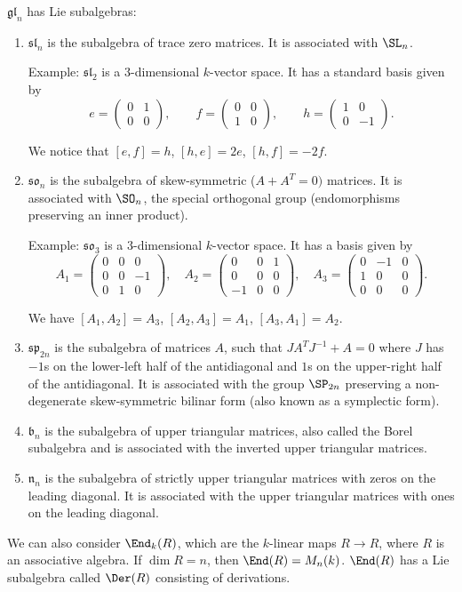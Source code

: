 $\mathfrak{gl}_n$ has Lie subalgebras:
\begin{enumerate}[label=(\arabic*)]
	\item $\mathfrak{sl}_n$ is the subalgebra of trace zero matrices. It is
		associated with $\SL_n$.

		Example: $\mathfrak{sl}_2$ is a $3$-dimensional $k$-vector space. It
		has a standard basis given by
		\[ e = \begin{pmatrix}0 & 1\\0 & 0\end{pmatrix},\qquad
			f = \begin{pmatrix}0 & 0\\1&0\end{pmatrix},\qquad
			h = \begin{pmatrix}1&0\\0&-1\end{pmatrix}. \]

		We notice that  $[e, f] = h$, $[h, e] = 2e$, $[h, f] = -2f$.

	\item $\mathfrak{so}_n$ is the subalgebra of skew-symmetric ($A + A^T = 0)$
		matrices. It is associated with $\SO_n$, the special orthogonal group
		(endomorphisms preserving an inner product).

		Example: $\mathfrak{so}_3$ is a $3$-dimensional $k$-vector space. It
		has a basis given by
		\[ A_1 = \begin{pmatrix}0&0&0\\0&0&-1\\0&1&0\end{pmatrix},\quad
			A_2 = \begin{pmatrix}0&0&1\\0&0&0\\-1&0&0\end{pmatrix},\quad
				A_3 = \begin{pmatrix}0&-1&0\\1&0&0\\0&0&0\end{pmatrix}.\]

		We have $[A_1, A_2] = A_3$,  $[A_2, A_3] = A_1$, $[A_3, A_1] = A_2$.

	\item $\mathfrak{sp}_{2n}$ is the subalgebra of matrices $A$, such that
		$JA^TJ^{-1} + A = 0$ where $J$ has $-1$s on the lower-left half of the
		antidiagonal and $1$s on the upper-right half of the antidiagonal. It
		is associated with the group $\SP_{2n}$ preserving a non-degenerate
		skew-symmetric bilinar form (also known as a symplectic form).

	\item $\mathfrak{b}_n$ is the subalgebra of upper triangular matrices, also
		called the Borel subalgebra and is associated with the inverted upper
		triangular matrices.

	\item $\mathfrak{n}_n$ is the subalgebra of strictly upper triangular matrices
		with zeros on the leading diagonal. It is associated with the upper triangular
		matrices with ones on the leading diagonal.
\end{enumerate}

We can also consider $\End_k(R)$, which are the $k$-linear maps $R\to R$, where
$R$ is an associative algebra. If $\dim R = n$, then $\End(R) = M_n(k)$.
 $\End(R)$ has a Lie subalgebra called $\Der(R)$ consisting of derivations.

